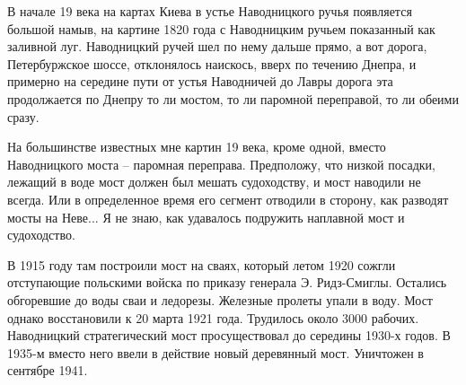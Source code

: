 В начале 19 века на картах Киева в устье Наводницкого ручья появляется большой намыв, на картине 1820 года с Наводницким ручьем показанный как заливной луг. Наводницкий ручей шел по нему дальше прямо, а вот дорога, Петербуржское шоссе, отклонялось наискось, вверх по течению Днепра, и примерно на середине пути от устья Наводничей до Лавры дорога эта продолжается по Днепру то ли мостом, то ли паромной переправой, то ли обеими сразу.

На большинстве известных мне картин 19 века, кроме одной, вместо Наводницкого моста – паромная переправа. Предположу, что низкой посадки, лежащий в воде мост должен был мешать судоходству, и мост наводили не всегда. Или в определенное время его сегмент отводили в сторону, как разводят мосты на Неве... Я не знаю, как удавалось подружить наплавной мост и судоходство.

В 1915 году там построили мост на сваях, который летом 1920 сожгли отступающие польскими войска по приказу генерала Э. Ридз-Смиглы. Остались обгоревшие до воды сваи и ледорезы. Железные пролеты упали в воду. Мост однако восстановили к 20 марта 1921 года. Трудилось около 3000 рабочих. 
Наводницкий стратегический мост просуществовал до середины 1930-х годов. В 1935-м вместо него ввели в действие новый деревянный мост. Уничтожен в сентябре 1941.\\


\medskip









